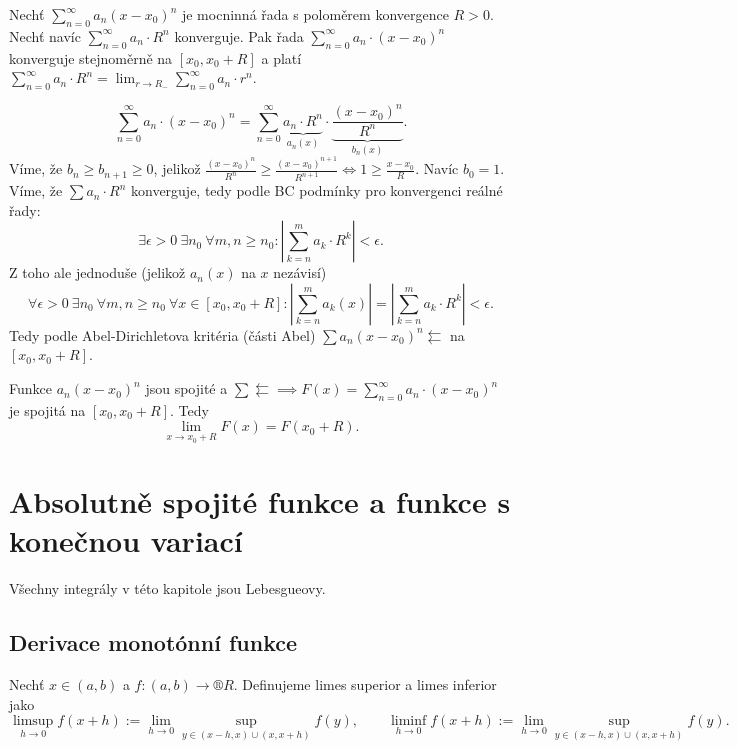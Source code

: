 \documentclass[12pt]{article}					%
\begin{document}
	\begin{veta}[Abelova]
		Nechť $\sum_{n=0}^∞ a_n (x - x_0)^n$ je mocninná řada s poloměrem konvergence $R > 0$. Nechť navíc $\sum_{n=0}^∞ a_n · R^n$ konverguje. Pak řada $\sum_{n=0}^∞ a_n·(x - x_0)^n$ konverguje stejnoměrně na $[x_0, x_0 + R]$ a platí $\sum_{n=0}^∞ a_n·R^n = \lim_{r \rightarrow R_-} \sum_{n=0}^∞ a_n · r^n$.

		\begin{dukazin}
			$$ \sum_{n=0}^∞ a_n · (x - x_0)^n = \sum_{n=0}^∞ \underbrace{a_n·R^n}_{a_n(x)}·\underbrace{\frac{(x - x_0)^n}{R^n}}_{b_n(x)}. $$
			Víme, že $b_n ≥ b_{n+1} ≥ 0$, jelikož $\frac{(x - x_0)^n}{R^n} ≥ \frac{(x - x_0)^{n+1}}{R^{n+1}} \Leftrightarrow 1 ≥ \frac{x - x_0}{R}$. Navíc $b_0 = 1$. Víme, že $\sum a_n·R^n$ konverguje, tedy podle BC podmínky pro konvergenci reálné řady:
			$$ \exists \epsilon > 0\ \exists n_0\ \forall m, n ≥ n_0: |\sum_{k=n}^m a_k·R^k| < \epsilon. $$
			Z toho ale jednoduše (jelikož $a_n(x)$ na $x$ nezávisí)
			$$ \forall \epsilon > 0\ \exists n_0\ \forall m, n ≥ n_0\ \forall x \in [x_0, x_0 + R]: |\sum_{k=n}^m a_k(x)| = |\sum_{k=n}^m a_k·R^k| < \epsilon. $$
			Tedy podle Abel-Dirichletova kritéria (části Abel) $\sum a_n(x - x_0)^n \leftleftarrows$ na $[x_0, x_0 + R]$.

			Funkce $a_n (x - x_0)^n$ jsou spojité a $\sum \leftleftarrows \implies F(x) = \sum_{n=0}^∞ a_n·(x - x_0)^n$ je spojitá na $[x_0, x_0 + R]$. Tedy
			$$ \lim_{x \rightarrow x_0 + R} F(x) = F(x_0 + R). $$
		\end{dukazin}
	\end{veta}

\section{Absolutně spojité funkce a funkce s konečnou variací}
	\begin{poznamka}
		Všechny integrály v této kapitole jsou Lebesgueovy.
	\end{poznamka}

	\subsection{Derivace monotónní funkce}
	\begin{definice}
		Nechť $x \in (a, b)$ a $f: (a, b) \rightarrow ®R$. Definujeme limes superior a limes inferior jako
		$$ \limsup_{h \rightarrow 0} f(x + h) := \lim_{h \rightarrow 0} \sup_{y \in (x - h, x) \cup (x, x + h)} f(y), \qquad \liminf_{h \rightarrow 0} f(x + h) := \lim_{h \rightarrow 0} \sup_{y \in (x - h, x) \cup (x, x + h)} f(y).$$
	\end{definice}
\end{document}
